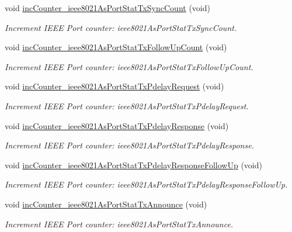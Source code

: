 \begin{DoxyCompactItemize}
void \hyperlink{class_common_port_ac40c61600d4b809b267d06d6cc7ca469}{inc\+Counter\+\_\+ieee8021\+As\+Port\+Stat\+Tx\+Sync\+Count} (void)
\begin{DoxyCompactList}\small\item\em Increment I\+E\+EE Port counter\+: ieee8021\+As\+Port\+Stat\+Tx\+Sync\+Count. \end{DoxyCompactList}\item 
void \hyperlink{class_common_port_ae5cfa5848fcdcb7c50e2ffaecee3bf24}{inc\+Counter\+\_\+ieee8021\+As\+Port\+Stat\+Tx\+Follow\+Up\+Count} (void)
\begin{DoxyCompactList}\small\item\em Increment I\+E\+EE Port counter\+: ieee8021\+As\+Port\+Stat\+Tx\+Follow\+Up\+Count. \end{DoxyCompactList}\item 
void \hyperlink{class_common_port_ac85c9bd4c8f35aba8afa2cab2506e233}{inc\+Counter\+\_\+ieee8021\+As\+Port\+Stat\+Tx\+Pdelay\+Request} (void)
\begin{DoxyCompactList}\small\item\em Increment I\+E\+EE Port counter\+: ieee8021\+As\+Port\+Stat\+Tx\+Pdelay\+Request. \end{DoxyCompactList}\item 
void \hyperlink{class_common_port_a087395d74c2c83289e02a786b0c2e874}{inc\+Counter\+\_\+ieee8021\+As\+Port\+Stat\+Tx\+Pdelay\+Response} (void)
\begin{DoxyCompactList}\small\item\em Increment I\+E\+EE Port counter\+: ieee8021\+As\+Port\+Stat\+Tx\+Pdelay\+Response. \end{DoxyCompactList}\item 
void \hyperlink{class_common_port_affb0d1a3b1dd0a337af7e1b64a8b8bd8}{inc\+Counter\+\_\+ieee8021\+As\+Port\+Stat\+Tx\+Pdelay\+Response\+Follow\+Up} (void)
\begin{DoxyCompactList}\small\item\em Increment I\+E\+EE Port counter\+: ieee8021\+As\+Port\+Stat\+Tx\+Pdelay\+Response\+Follow\+Up. \end{DoxyCompactList}\item 
void \hyperlink{class_common_port_ac20ce3b8128ccb0d3015c14fbf126737}{inc\+Counter\+\_\+ieee8021\+As\+Port\+Stat\+Tx\+Announce} (void)
\begin{DoxyCompactList}\small\item\em Increment I\+E\+EE Port counter\+: ieee8021\+As\+Port\+Stat\+Tx\+Announce. \end{DoxyCompactList}\item 

\end{DoxyCompactItemize}
